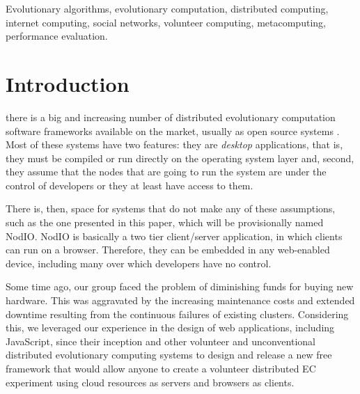 \documentclass[journal,onecolumn]{IEEEtran}
\begin{document}
\begin{IEEEkeywords}
Evolutionary algorithms, evolutionary computation, distributed computing, internet computing,
social networks, volunteer computing, metacomputing, performance evaluation.
\end{IEEEkeywords}

\section{Introduction}

 there is a big and increasing number of
distributed evolutionary computation software frameworks available on
the market, usually as open source systems \cite{Parejo12Survey}. Most of these systems have 
two features: they are {\em desktop} applications, that is, they must
be compiled or run directly on the operating system layer and, second,
they assume that the nodes that are going to run the system are under
the control of developers or they at least have access to them.

There is, then, space for systems that do not make any of these
assumptions, such as the one presented in this paper, which will be
provisionally named {\sf NodIO}. {\sf NodIO} is basically
a two tier client/server 
application, in which clients can run on a browser. 
Therefore, they can
be embedded in any web-enabled device, including many over which 
developers have no control.

Some time ago, our group faced the problem of diminishing funds for
buying new hardware. This was aggravated by the increasing maintenance costs and
extended downtime resulting from the continuous failures of existing
clusters.
Considering this, we leveraged 
our experience in the design of web
applications, including JavaScript, since their inception and other
volunteer and
unconventional distributed evolutionary computing systems to 
design and release a new free framework that would allow anyone to
create a volunteer distributed EC experiment using cloud resources as
servers and browsers as clients.
\end{document}
